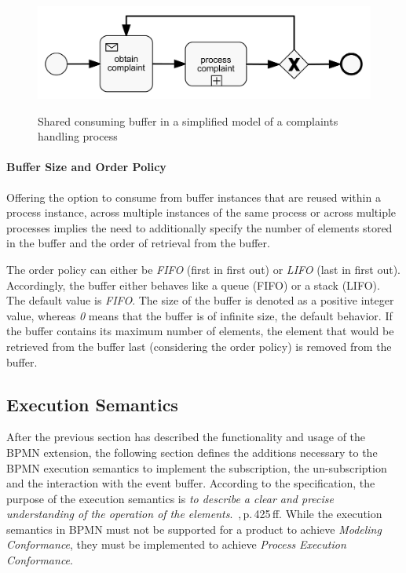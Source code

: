\begin{figure}[]
	\myfloatalign
	{\includegraphics[width=1\linewidth]{chapters/concept/bpmnx/ComplaintProcessing.png}}
	\caption{Shared consuming buffer in a simplified model of a complaints handling process}\label{fig:example-complaints}
\end{figure}

\paragraph{Buffer Size and Order Policy}
Offering the option to consume from buffer instances that are reused within a process instance, across multiple instances of the same process or across multiple processes implies the need to additionally specify the number of elements stored in the buffer and the order of retrieval from the buffer.

The order policy can either be \textit{FIFO} (first in first out) or \textit{LIFO} (last in first out). Accordingly, the buffer either behaves like a queue (FIFO) or a stack (LIFO). The default value is \textit{FIFO}.
The size of the buffer is denoted as a positive integer value, whereas \textit{0} means that the buffer is of infinite size, the default behavior. If the buffer contains its maximum number of elements, the element that would be retrieved from the buffer last (considering the order policy) is removed from the buffer.

\subsection{Execution Semantics}\label{bpmnx:executionsemantics}

After the previous section has described the functionality and usage of the BPMN extension, the following section defines the additions necessary to the BPMN execution semantics to implement the subscription, the un-subscription and the interaction with the event buffer.
According to the specification, the purpose of the execution semantics is \textit{to describe a clear and precise understanding of the operation of the elements}.~\cite{bpmnspec},\,p.\,425\,ff.
While the execution semantics in BPMN must not be supported for a product to achieve \textit{Modeling Conformance}, they must be implemented to achieve \textit{Process Execution Conformance}.

